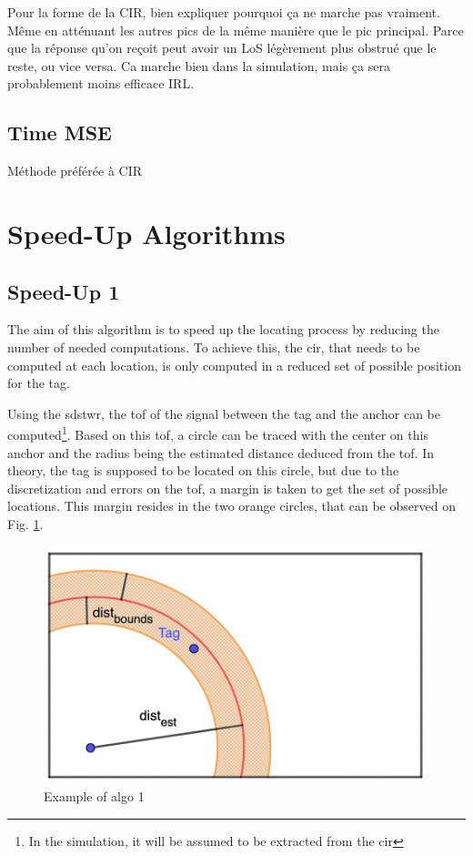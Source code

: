Pour la forme de la CIR, bien expliquer pourquoi ça ne marche pas vraiment. Même en atténuant les autres pics de la même manière que le pic principal. Parce que la réponse qu'on reçoit peut avoir un LoS légèrement plus obstrué que le reste, ou vice versa. Ca marche bien dans la simulation, mais ça sera probablement moins efficace IRL.

\subsection{Time MSE}

Méthode préférée à CIR

\section{Speed-Up Algorithms}
\label{speed-up}
\subsection{Speed-Up 1}

The aim of this algorithm is to speed up the locating process by reducing the number of needed computations. To achieve this, the \gls{cir}, that needs to be computed at each location, is only computed in a reduced set of possible position for the tag.
\vspace{2mm}

Using the \gls{sdstwr}, the \gls{tof} of the signal between the tag and the anchor can be computed\footnote{In the simulation, it will be assumed to be extracted from the \gls{cir}}. Based on this \gls{tof}, a circle can be traced with the center on this anchor and the radius being the estimated distance deduced from the \gls{tof}. In theory, the tag is supposed to be located on this circle, but due to the discretization and errors on the \gls{tof}, a margin is taken to get the set of possible locations. This margin resides in the two orange circles, that can be observed on Fig. \ref{fig:speedup_1}.
\vspace{2mm}

\begin{figure}[H]
\centering
\includegraphics[width=.65\linewidth]{Images/algo_1.png}
\caption{Example of algo 1}
\label{fig:speedup_1}
\end{figure}

